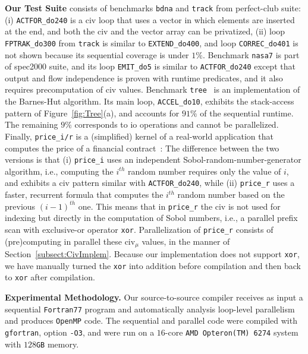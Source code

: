 \documentclass[10pt,nocopyrightspace]{sigplanconf}
\begin{document}
{\bf Our Test Suite} consists of benchmarks {\tt bdna} and {\tt track} 
from {\sc perfect-club} suite: (i) {\tt ACTFOR\_do240} is a {\sc civ} loop
that uses a vector in which elements are inserted at the end, and
both the {\sc civ} and the vector array can be privatized, (ii) 
loop {\tt FPTRAK\_do300} from {\tt track} is similar to {\tt EXTEND\_do400},
and loop {\tt CORREC\_do401} is not shown because 
its sequential coverage is under $1\%$. 
%
Benchmark {\tt nasa7} is part of {\sc spec2000} suite, and its loop {\tt EMIT\_do5}
is similar to {\tt ACTFOR\_do240} except that output and flow independence 
is proven with runtime predicates, and it also requires precomputation of {\sc civ} values.
%
Benchmark {\tt tree}~\cite{Treecode} is an implementation of the Barnes-Hut algorithm.
Its main loop, {\tt ACCEL\_do10}, exhibits the stack-access pattern of Figure~\ref{fig:Tree}(a),
and accounts for $91\%$ of the sequential runtime. The remaining $9\%$ corresponds to {\sc io}
operations and cannot be parallelized.
%
Finally,  {\tt price\_i/r} is a (simplified) kernel of a real-world application that
computes the price of a financial contract~\cite{LexiFiPricing}:   The difference
between the two versions is that (i) {\tt price\_i} uses an independent Sobol-random-number-generator
algorithm, i.e., computing the $i^{th}$ random number requires only the value of $i$,
and exhibits a {\sc civ} pattern similar with {\tt ACTFOR\_do240}, 
while (ii) {\tt price\_r} uses a faster, recurrent formula that computes the 
$i^{th}$ random number based on the previous $(i-1)^{th}$ one. 
This means that in {\tt price\_r} the {\sc civ} is not used for indexing
but directly in the computation of Sobol numbers, i.e., a parallel prefix 
scan with exclusive-or operator {\tt xor}. 
Parallelization of {\tt price\_r} consists of (pre)computing
in parallel these {\sc civ}$_\mu$ values, in the manner of 
Section~\ref{subsect:CivImplem}.   
%
Because our implementation does not support {\tt xor},
we have manually turned the {\tt xor} into addition before 
compilation and then back to {\tt xor} after compilation. 

\vspace{1ex}

{\bf Experimental Methodology.} Our source-to-source compiler receives as
input a sequential {\tt Fortran77} program and automatically analysis loop-level 
parallelism and produces {\tt OpenMP} code.  The sequential and parallel 
code were compiled with {\tt gfortran}, option {\tt -O3}, and were run on 
a $16$-core {\tt AMD Opteron(TM) 6274} system with $128${\tt GB} memory. 
\end{document}
